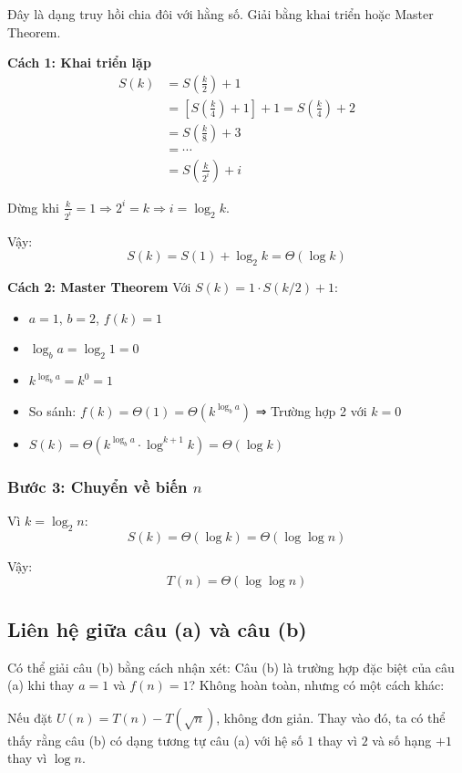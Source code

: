 \documentclass{article}
\begin{document}
Đây là dạng truy hồi chia đôi với hằng số. Giải bằng khai triển hoặc Master Theorem.

\textbf{Cách 1: Khai triển lặp}
\[
\begin{aligned}
S(k) &= S\left(\frac{k}{2}\right) + 1 \\
&= \left[S\left(\frac{k}{4}\right) + 1\right] + 1 = S\left(\frac{k}{4}\right) + 2 \\
&= S\left(\frac{k}{8}\right) + 3 \\
&= \cdots \\
&= S\left(\frac{k}{2^i}\right) + i
\end{aligned}
\]

Dừng khi \(\frac{k}{2^i} = 1 \Rightarrow 2^i = k \Rightarrow i = \log_2 k\).

Vậy:
\[
S(k) = S(1) + \log_2 k = \Theta(\log k)
\]

\textbf{Cách 2: Master Theorem}
Với \(S(k) = 1 \cdot S(k/2) + 1\):
\begin{itemize}
    \item \(a = 1\), \(b = 2\), \(f(k) = 1\)
    \item \(\log_b a = \log_2 1 = 0\)
    \item \(k^{\log_b a} = k^0 = 1\)
    \item So sánh: \(f(k) = \Theta(1) = \Theta(k^{\log_b a})\) ⇒ Trường hợp 2 với \(k = 0\)
    \item \(S(k) = \Theta(k^{\log_b a} \cdot \log^{k+1} k) = \Theta(\log k)\)
\end{itemize}

\subsubsection{Bước 3: Chuyển về biến \(n\)}

Vì \(k = \log_2 n\):
\[
S(k) = \Theta(\log k) = \Theta(\log \log n)
\]

Vậy:
\[
\boxed{T(n) = \Theta(\log \log n)}
\]

\subsection{Liên hệ giữa câu (a) và câu (b)}

Có thể giải câu (b) bằng cách nhận xét: Câu (b) là trường hợp đặc biệt của câu (a) khi thay \(a = 1\) và \(f(n) = 1\)? Không hoàn toàn, nhưng có một cách khác:

Nếu đặt \(U(n) = T(n) - T(\sqrt{n})\), không đơn giản. Thay vào đó, ta có thể thấy rằng câu (b) có dạng tương tự câu (a) với hệ số \(1\) thay vì \(2\) và số hạng \(+1\) thay vì \(\log n\).
\end{document}
